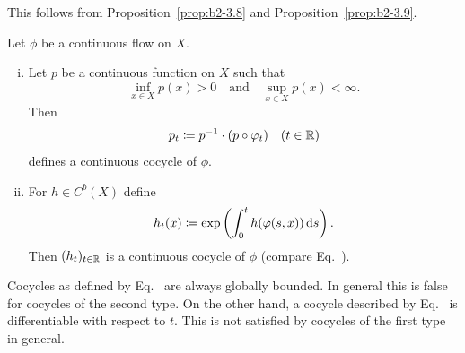This follows from Proposition~\ref{prop:b2-3.8} and Proposition~\ref{prop:b2-3.9}.
\begin{example}\label{ex:b2-3.11}
Let $\phi$ be a continuous flow on $X$.
\begin{enumerate}[(i), wide, labelindent=.25em]
\item \label{ex:b2-3.11-1}
Let $p$ be a continuous function on $X$ such that 
%
\[
	\inf_{x \in X} p(x) > 0 \quad \text{and} \quad \sup_{x \in X} p(x) < \infty.
\]
%
Then
\begin{equation}\label{eq:b2-3.13}
p_{t} \coloneq p^{-1} \cdot (p \circ \phi_{t}) \quad (t \in \R)
\end{equation}
defines a continuous cocycle of\/ $\phi$.
\item \label{ex:b2-3.11-2}
For $h \in C^{b}(X)$ define
\begin{equation}\label{eq:b2-3.14}
h_{t}(x) \coloneq \exp\left(\int_{0}^{t} h(\phi(s,x))  \ds \right).
\end{equation}
Then $(h_{t})_{t \in \mathbb{R}}$ is a continuous cocycle of\/ $\phi$ (compare Eq.~).
\end{enumerate}
\end{example}
Cocycles as defined by Eq.~ are always globally bounded.
In general this is false for cocycles of the second type.
On the other hand, a cocycle described by Eq.~ is differentiable with respect to $t$.
This is not satisfied by cocycles of the first type in general.

